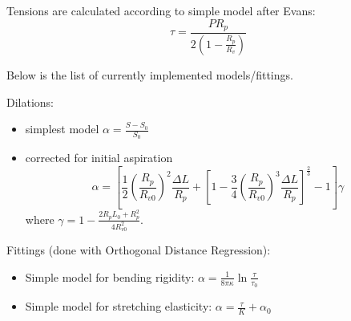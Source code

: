 \documentclass[a4paper,12pt]{article}
\begin{document}
Tensions are calculated according to simple model after Evans:
\begin{equation}
\tau = \frac{P R_p}{2\left(1-\frac{R_p}{R_v}\right)}
\label{eq:tau-evans}
\end{equation}

Below is the list of currently implemented models/fittings.

Dilations:
\begin{itemize}
	\item simplest model $\alpha = \frac{S-S_0}{S_0}$
	\item corrected for initial aspiration \cite{Henriksen2004}
	\begin{equation}
		\alpha = \left[
		 \frac{1}{2} \left(\frac{R_p}{R_{v0}}\right)^2 \frac{\Delta L}{R_p} 
		 + \left[1-\frac{3}{4}\left(\frac{R_p}{R_{v0}}\right)^3 \frac{\Delta L}{R_p} \right]^{\frac{2}{3}}
		 - 1 
		\right]\gamma
		\label{eq:alpha-henriksen}
	\end{equation}
	where $\displaystyle{\gamma = 1-\frac{2R_p L_0+R_p^2}{4R_{v0}^2}}$.

\end{itemize}

Fittings (done with Orthogonal Distance Regression):
\begin{itemize}
	\item Simple model for bending rigidity: $\alpha=\frac{1}{8\pi\kappa}\ln{\frac{\tau}{\tau_0}}$
	\item Simple model for stretching elasticity: $\alpha=\frac{\tau}{K}+\alpha_0$
\end{itemize}
\end{document}
